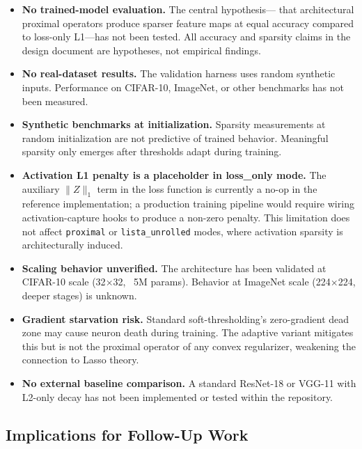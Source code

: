 \documentclass{article}
\begin{document}
\begin{itemize}
    \item \textbf{No trained-model evaluation.} The central hypothesis---
          that architectural proximal operators produce sparser feature maps
          at equal accuracy compared to loss-only L1---has not been tested.
          All accuracy and sparsity claims in the design document are
          hypotheses, not empirical findings.
    \item \textbf{No real-dataset results.} The validation harness uses
          random synthetic inputs. Performance on CIFAR-10, ImageNet, or
          other benchmarks has not been measured.
    \item \textbf{Synthetic benchmarks at initialization.} Sparsity
          measurements at random initialization are not predictive of
          trained behavior. Meaningful sparsity only emerges after
          thresholds adapt during training.
    \item \textbf{Activation L1 penalty is a placeholder in loss\_only mode.}
          The auxiliary $\|Z\|_1$ term in the loss function is currently a
          no-op in the reference implementation; a production training pipeline
          would require wiring activation-capture hooks to produce a non-zero
          penalty. This limitation does not affect \texttt{proximal} or
          \texttt{lista\_unrolled} modes, where activation sparsity is
          architecturally induced.
    \item \textbf{Scaling behavior unverified.} The architecture has been
          validated at CIFAR-10 scale (32$\times$32, ~5M params). Behavior
          at ImageNet scale (224$\times$224, deeper stages) is unknown.
    \item \textbf{Gradient starvation risk.} Standard soft-thresholding's
          zero-gradient dead zone may cause neuron death during training.
          The adaptive variant mitigates this but is not the proximal
          operator of any convex regularizer, weakening the connection
          to Lasso theory.
    \item \textbf{No external baseline comparison.} A standard ResNet-18
          or VGG-11 with L2-only decay has not been implemented or tested
          within the repository.
\end{itemize}

\subsection{Implications for Follow-Up Work}
\end{document}
